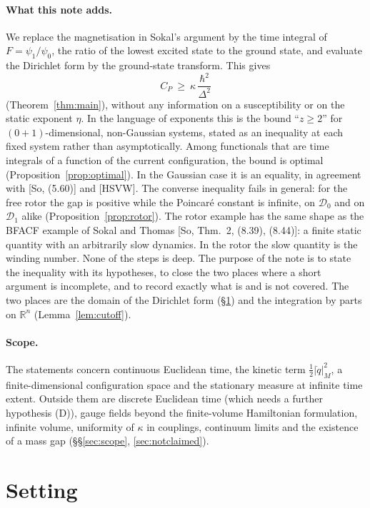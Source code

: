 \documentclass[11pt,a4paper]{article}
\theoremstyle{definition}
\theoremstyle{remark}
\newcommand{\R}{\mathbb{R}}
\newcommand{\cD}{\mathcal{D}}
\begin{document}
\paragraph{What this note adds.}
We replace the magnetisation in Sokal's argument by the time integral of $F=\psi_1/\psi_0$, the ratio of the lowest excited state to the ground state, and evaluate the Dirichlet form by the ground-state transform.
This gives
\[
  C_P\ \ge\ \kappa\,\frac{\hbar^2}{\Delta^2}
\]
(Theorem~\ref{thm:main}), without any information on a susceptibility or on the static exponent $\eta$.
In the language of exponents this is the bound ``$z\ge2$'' for $(0+1)$-dimensional, non-Gaussian systems, stated as an inequality at each fixed system rather than asymptotically.
Among functionals that are time integrals of a function of the current configuration, the bound is optimal (Proposition~\ref{prop:optimal}).
In the Gaussian case it is an equality, in agreement with [So, (5.60)] and [HSVW].
The converse inequality fails in general: for the free rotor the gap is positive while the Poincar\'e constant is infinite, on $\cD_0$ and on $\cD_1$ alike (Proposition~\ref{prop:rotor}).
The rotor example has the same shape as the BFACF example of Sokal and Thomas [So, Thm.~2, (8.39), (8.44)]: a finite static quantity with an arbitrarily slow dynamics.
In the rotor the slow quantity is the winding number.
None of the steps is deep.
The purpose of the note is to state the inequality with its hypotheses, to close the two places where a short argument is incomplete, and to record exactly what is and is not covered.
The two places are the domain of the Dirichlet form (\S\ref{sec:setting}) and the integration by parts on $\R^n$ (Lemma~\ref{lem:cutoff}).

\paragraph{Scope.}
The statements concern continuous Euclidean time, the kinetic term $\tfrac12|\dot q|_M^2$, a finite-dimensional configuration space and the stationary measure at infinite time extent.
Outside them are discrete Euclidean time (which needs a further hypothesis (D)), gauge fields beyond the finite-volume Hamiltonian formulation, infinite volume, uniformity of $\kappa$ in couplings, continuum limits and the existence of a mass gap (\S\S\ref{sec:scope}, \ref{sec:notclaimed}).


\section{Setting}\label{sec:setting}
\end{document}
